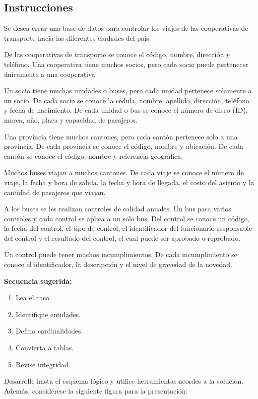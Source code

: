 \documentclass{article}
\begin{document}
\subsection{Instrucciones}

Se desea crear una base de datos para controlar los viajes de las cooperativas de transporte hacia las diferentes ciudades del país.

De las cooperativas de transporte se conoce el código, nombre, dirección y teléfono. Una cooperativa tiene muchos socios, pero cada socio puede pertenecer únicamente a una cooperativa.

Un socio tiene muchas unidades o buses, pero cada unidad pertenece solamente a un socio. De cada socio se conoce la cédula, nombre, apellido, dirección, teléfono y fecha de nacimiento. De cada unidad o bus se conoce el número de disco (ID), marca, año, placa y capacidad de pasajeros.

Una provincia tiene muchos cantones, pero cada cantón pertenece solo a una provincia. De cada provincia se conoce el código, nombre y ubicación. De cada cantón se conoce el código, nombre y referencia geográfica.

Muchos buses viajan a muchos cantones. De cada viaje se conoce el número de viaje, la fecha y hora de salida, la fecha y hora de llegada, el costo del asiento y la cantidad de pasajeros que viajan.

A los buses se les realizan controles de calidad anuales. Un bus pasa varios controles y cada control se aplica a un solo bus. Del control se conoce un código, la fecha del control, el tipo de control, el identificador del funcionario responsable del control y el resultado del control, el cual puede ser aprobado o reprobado.

Un control puede tener muchos incumplimientos. De cada incumplimiento se conoce el identificador, la descripción y el nivel de gravedad de la novedad.

\textbf{Secuencia sugerida:}
\begin{enumerate}
    \item Lea el caso.
    \item Identifique entidades.
    \item Defina cardinalidades.
    \item Convierta a tablas.
    \item Revise integridad.
\end{enumerate}

Desarrolle hasta el esquema lógico y utilice herramientas acordes a la solución. Además, considérese la siguiente figura para la presentación:
\end{document}
